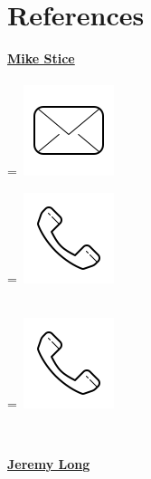 \documentclass[]{latex/resume}
\begin{document}
\begin{minipage}[t]{0.25\textwidth}
    \sectionsep


\section{References}

    \href{}{\textbf{Mike Stice}} \\
     \\
    \begingroup
        =\hbox{ \includegraphics[scale=0.1,trim={0 1cm 0cm 0cm}]{latex/icons/mail.png}\hspace{0.1cm}  }
        \parbox{\wd0}{}
    \endgroup
    
    \begingroup
        =\hbox{
        \includegraphics[scale=0.1,trim={0 1.25cm -0.4cm 0cm}]{latex/icons/phone.png}\hspace{0.3cm}
        }
        \parbox{\wd0}{}
    \endgroup \\
    \begingroup
        =\hbox{
        \includegraphics[scale=0.1,trim={0 1.25cm -0.4cm 0cm}]{latex/icons/phone.png}\hspace{0.3cm}
        }
        \parbox{\wd0}{}
    \endgroup \\ 

    \sectionsep
    
    \href{}{\textbf{Jeremy Long}} \\
     \\


\end{minipage}
\end{document}
